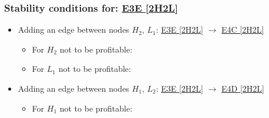 

\subsubsection{Stability conditions for: \hyperref[apx:E3E:2H2L]{E3E [2H2L]}}
\label{apx:E3E:2H2L_stability_cond}

\begin{itemize}

	\item Adding an edge between nodes $H_2$, $L_1$: \hyperref[apx:E3E:2H2L]{E3E [2H2L]} $\to$ \hyperref[apx:E4C:2H2L]{E4C [2H2L]}

	\begin{itemize}

		\item For $H_2$ not to be profitable:


		\item For $L_1$ not to be profitable:


	\end{itemize}

	\item Adding an edge between nodes $H_1$, $L_2$: \hyperref[apx:E3E:2H2L]{E3E [2H2L]} $\to$ \hyperref[apx:E4D:2H2L]{E4D [2H2L]}

	\begin{itemize}

		\item For $H_1$ not to be profitable:


\end{itemize}
\end{itemize}
